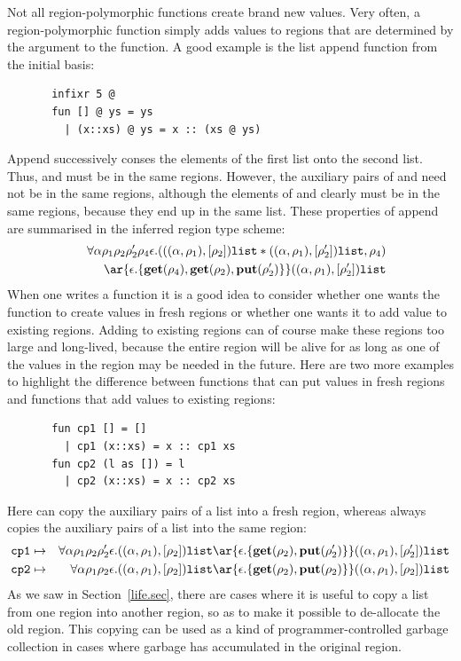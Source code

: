 \documentclass[12pt]{book}
\begin{document}
Not all region-polymorphic functions create brand new values. Very often, a
region-polymorphic function simply adds values to regions that are determined
by the argument to the function. A good example is the list append function
from the initial basis:
\begin{verbatim}
       infixr 5 @
       fun [] @ ys = ys
         | (x::xs) @ ys = x :: (xs @ ys)
\end{verbatim}
Append successively conses the elements of the first list onto the second list.
Thus,  and  must be in the same regions. However, the auxiliary pairs of
  and  need not be in the same regions, although
the elements of  and  clearly must be in the same regions,
because they end up in the same list. These properties of append are summarised
in the inferred region type scheme:
\begin{eqnarray*}
&&\forall\alpha\rho_1\rho_2\rho_2'\rho_4\epsilon.
   ( ((\alpha,\rho_1),[\rho_2])\boxml{list} \ast
      ((\alpha,\rho_1),[\rho_2'])\boxml{list}, \rho_4) \\ 
&&\ar{\epsilon.\{\Get(\rho_4),\Get(\rho_2),\Put(\rho_2')\}} ((\alpha,\rho_1),[\rho_2'])\boxml{list}
\end{eqnarray*}
When one writes a  function it is a good idea to consider
whether one wants the function  to create values in fresh regions or
whether one wants it to add value to existing regions. 
Adding to existing
regions can of course make these regions too large and long-lived,
because the entire region will be alive for as long as one of the values
in the region may be needed in the future. 
Here are two more examples
to highlight the difference between functions that can put values in
fresh regions and functions that add values to existing regions:
\begin{verbatim}
       fun cp1 [] = []   
         | cp1 (x::xs) = x :: cp1 xs
       fun cp2 (l as []) = l
         | cp2 (x::xs) = x :: cp2 xs
\end{verbatim}
Here  can copy the auxiliary pairs of a list into a fresh region, whereas  always
copies the auxiliary pairs of a list into the same region:
\begin{eqnarray*}
\boxml{cp1}&\mapsto&\forall\alpha\rho_1\rho_2\rho_2'\epsilon.
     ((\alpha,\rho_1),[\rho_2])\boxml{list} \ar{\epsilon.\{\Get(\rho_2),
           \Put(\rho_2')\}} ((\alpha,\rho_1),[\rho_2'])\boxml{list}\\
\boxml{cp2}&\mapsto&\forall\alpha\rho_1\rho_2\epsilon.
     ((\alpha,\rho_1),[\rho_2])\boxml{list} \ar{\epsilon.\{\Get(\rho_2),
           \Put(\rho_2)\}} ((\alpha,\rho_1),[\rho_2])\boxml{list}
\end{eqnarray*}
As we saw in Section~\ref{life.sec}, there are cases where it is useful to copy a list from one region into another region,
so as to make it possible to de-allocate the old region. This copying can be used
as a kind of programmer-controlled garbage collection in cases where garbage has accumulated
in the original region. 
\end{document}
